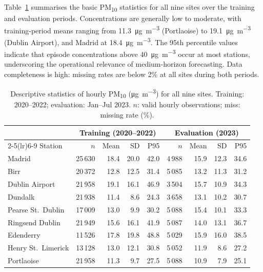 \documentclass[12pt,a4paper]{article}
\newcommand{\PMten}{PM\textsubscript{10}}
\begin{document}
Table~\ref{tab:descriptive} summarises the basic \PMten{} statistics for all
nine sites over the training and evaluation periods.  Concentrations are
generally low to moderate, with training-period means ranging from
11.3~\si{\micro\gram\per\cubic\metre} (Portlaoise) to
19.1~\si{\micro\gram\per\cubic\metre} (Dublin Airport), and Madrid at
18.4~\si{\micro\gram\per\cubic\metre}.  The 95th percentile values indicate
that episode concentrations above 40~\si{\micro\gram\per\cubic\metre} occur
at most stations, underscoring the operational relevance of medium-horizon
forecasting.  Data completeness is high: missing rates are below 2\% at all
sites during both periods.

\begin{table}[htbp]
\centering
\caption{Descriptive statistics of hourly \PMten{}
  (\si{\micro\gram\per\cubic\metre}) for all nine sites.
  Training: 2020--2022; evaluation: Jan--Jul 2023.
  $n$: valid hourly observations; miss: missing rate (\%).}
\label{tab:descriptive}
\small
\begin{tabular}{lrrrrrrrr}
\toprule
 & \multicolumn{4}{c}{Training (2020--2022)} & \multicolumn{4}{c}{Evaluation (2023)} \\
\cmidrule(lr){2-5}\cmidrule(lr){6-9}
Station & $n$ & Mean & SD & P95 & $n$ & Mean & SD & P95 \\
\midrule
Madrid              & 25\,630 & 18.4 & 20.0 & 42.0 & 4\,988 & 15.9 & 12.3 & 34.6 \\
\midrule
Birr                & 20\,372 & 12.8 & 12.5 & 31.4 & 5\,085 & 13.2 & 11.3 & 31.2 \\
Dublin Airport      & 21\,958 & 19.1 & 16.1 & 46.9 & 3\,504 & 15.7 & 10.9 & 34.3 \\
Dundalk             & 21\,938 & 11.4 &  8.6 & 24.3 & 3\,658 & 13.1 & 10.2 & 30.7 \\
Pearse St.\ Dublin  & 17\,009 & 13.0 &  9.9 & 30.2 & 5\,088 & 15.4 & 10.1 & 33.3 \\
Ringsend Dublin     & 21\,949 & 15.6 & 16.1 & 41.9 & 5\,087 & 14.0 & 13.1 & 36.7 \\
Edenderry           & 11\,526 & 17.8 & 19.8 & 48.8 & 5\,029 & 15.9 & 16.0 & 38.5 \\
Henry St.\ Limerick & 13\,128 & 13.0 & 12.1 & 30.8 & 5\,052 & 11.9 &  8.6 & 27.2 \\
Portlaoise          & 21\,958 & 11.3 &  9.7 & 27.5 & 5\,088 & 10.9 &  7.9 & 25.1 \\
\bottomrule
\end{tabular}
\end{table}
\end{document}
